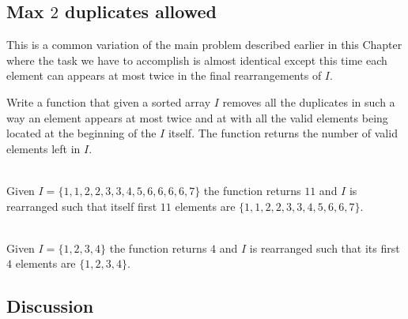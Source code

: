 \subsection{Max $2$ duplicates allowed}
This is a common variation of the main problem described earlier in this Chapter where the task 
we have to accomplish is almost identical except this time each element can appears at most 
twice in the final rearrangements of $I$.
\begin{exercise}
	Write a function that given a sorted array $I$ removes all the 
	duplicates in such a way an element appears at most twice and at with all the valid elements being located at the beginning of the $I$ itself.
	The function returns the number of valid elements left in $I$.
	
	\label{example:remove_duplicated_sorted_array_inplace:exercice2}
	
		\begin{example}
			\label{example:remove_duplicated_sorted_array_inplace_variation1:example1}
			\hfill \\
			Given $I=\{1,1,2,2,3,3,4,5,6,6,6,6,7\}$ the function returns $11$ and $I$ is rearranged such
			that itself first $11$ elements are $\{1,1,2,2,3,3,4,5,6,6,7\}$.				
		\end{example}
	
		\begin{example}
			\label{example:remove_duplicated_sorted_array_inplace_variation1:example2}
			\hfill \\
			Given $I=\{1,2,3,4\}$ the function returns $4$ and $I$ is rearranged such that its first $4$
			elements are $\{1,2,3,4\}$.	
		\end{example}
	\end{exercise}

\subsection{Discussion}



